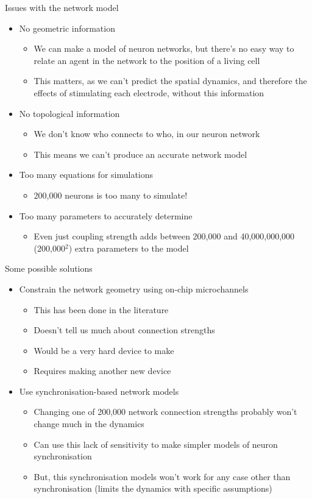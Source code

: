 \documentclass[presentation]{beamer}
\begin{document}
\begin{frame}[label={sec:org2956778}]{Issues with the network model}
\begin{itemize}
\item No geometric information 
\begin{itemize}
\item We can make a model of neuron networks, but there's no easy way to relate an agent in the network to the position of a living cell
\item This matters, as we can't predict the spatial dynamics, and therefore the effects of stimulating each electrode, without this information
\end{itemize}
\item No topological information
\begin{itemize}
\item We don't know who connects to who, in our neuron network
\item This means we can't produce an accurate network model
\end{itemize}
\item Too many equations for simulations
\begin{itemize}
\item 200,000 neurons is too many to simulate!
\end{itemize}
\item Too many parameters to accurately determine
\begin{itemize}
\item Even just coupling strength adds between 200,000 and 40,000,000,000 (200,000\(^{\text{2}}\)) extra parameters to the model
\end{itemize}
\end{itemize}
\end{frame}

\begin{frame}[label={sec:orge567322}]{Some possible solutions}
\begin{itemize}
\item Constrain the network geometry using on-chip microchannels
\begin{itemize}
\item This has been done in the literature
\item Doesn't tell us much about connection strengths
\item Would be a very hard device to make
\item Requires making another new device
\end{itemize}
\item Use synchronisation-based network models
\begin{itemize}
\item Changing one of 200,000 network connection strengths probably won't change much in the dynamics
\item Can use this lack of sensitivity to make simpler models of neuron synchronisation
\item But, this synchronisation models won't work for any case other than synchronisation (limits the dynamics with specific assumptions)
\end{itemize}
\end{itemize}
\end{frame}
\end{document}
